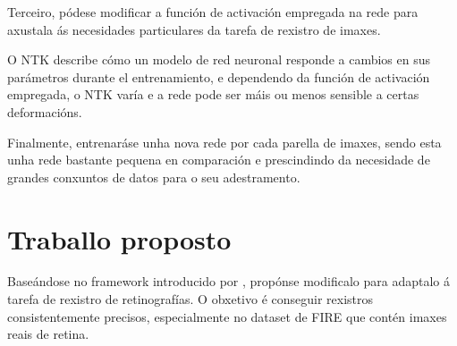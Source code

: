 Terceiro, pódese modificar a función de activación empregada na rede para axustala ás necesidades particulares da tarefa de rexistro de imaxes.

O \gls{NTK} describe cómo un modelo de red neuronal responde a cambios en sus parámetros durante el entrenamiento,
e dependendo da función de activación empregada, o NTK varía e a rede pode ser máis ou menos sensible a certas deformacións.

Finalmente, entrenaráse unha nova rede por cada parella de imaxes, sendo esta unha rede bastante pequena en comparación e prescindindo da necesidade de grandes conxuntos de datos para o seu adestramento.

\section{Traballo proposto}
\label{sec:Traballo proposto}

Baseándose no framework introducido por \cite{wolterink2021implicit},
 propónse modificalo para adaptalo á tarefa de rexistro de retinografías. O obxetivo é conseguir rexistros consistentemente precisos, especialmente no dataset de FIRE que contén imaxes reais de retina.
